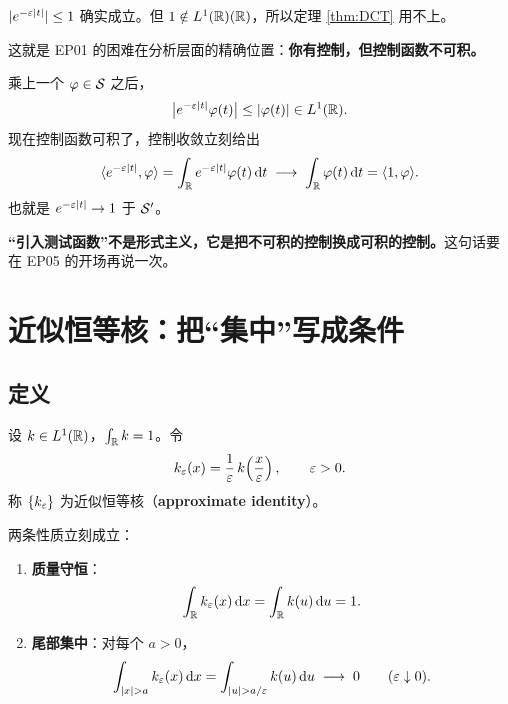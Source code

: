 $|e^{-\varepsilon|t|}|\le1$ 确实成立。但 $1\notin L^1(\mathbb{R})(\mathbb{R})$，所以定理 \ref{thm:DCT} 用不上。

这就是 EP01 的困难在分析层面的精确位置：\textbf{你有控制，但控制函数不可积。}

\begin{ideabox}[测试函数是怎么救场的]
乘上一个 $\varphi\in\mathcal{S}$ 之后，
\begin{equation}
\big|e^{-\varepsilon|t|}\varphi(t)\big|\le|\varphi(t)|\in L^1(\mathbb{R}) .
\end{equation}
现在控制函数可积了，控制收敛立刻给出
\begin{equation}
\langle e^{-\varepsilon|t|},\varphi\rangle=\int_{\mathbb{R}}e^{-\varepsilon|t|}\varphi(t)\mathop{}\!\mathrm{d} t
\;\longrightarrow\;\int_{\mathbb{R}}\varphi(t)\mathop{}\!\mathrm{d} t=\langle 1,\varphi\rangle.
\end{equation}
也就是 $e^{-\varepsilon|t|}\to1$ 于 $\mathcal{S}'$。

\textbf{“引入测试函数”不是形式主义，它是把不可积的控制换成可积的控制。}这句话要在 EP05 的开场再说一次。
\end{ideabox}

\section{近似恒等核：把“集中”写成条件}

\subsection{定义}

\begin{defn}[近似恒等核]\label{def:approx-id}
设 $k\in L^1(\mathbb{R})$，$\int_{\mathbb{R}}k=1$。令
\begin{equation}
k_\varepsilon(x)=\frac{1}{\varepsilon}\,k\!\left(\frac{x}{\varepsilon}\right),
\qquad \varepsilon>0 .\label{eq:dilate}
\end{equation}
称 $\{k_\varepsilon\}$ 为近似恒等核（\textbf{approximate identity}）。
\end{defn}

两条性质立刻成立：

\begin{enumerate}[leftmargin=2em,itemsep=0.45em]
\item \textbf{质量守恒}：
\begin{equation}
\int_{\mathbb{R}}k_\varepsilon(x)\mathop{}\!\mathrm{d} x=\int_{\mathbb{R}}k(u)\mathop{}\!\mathrm{d} u=1 .
\end{equation}
\item \textbf{尾部集中}：对每个 $a>0$，
\begin{equation}
\int_{|x|>a}k_\ep(x)\dd x=\int_{|u|>a/\ep}k(u)\dd u\;\longrightarrow\;0
\qquad(\ep\downarrow0).
\end{equation}
\end{enumerate}

